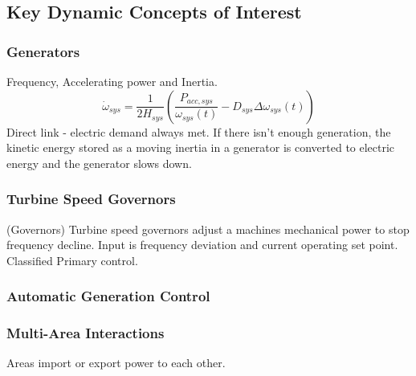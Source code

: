 \documentclass[14pt, unknownkeysallowed]{beamer}
\begin{document}
\subsection{Key Dynamic Concepts of Interest}
\begin{frame}
\frametitle{Generators}
Frequency, Accelerating power and Inertia.\\
\[ \dot{\omega}_{sys} = \dfrac{1}{2H_{sys} } \left( \dfrac{P_{acc, sys} }{\omega_{sys}(t)} - D_{sys}\Delta\omega_{sys}(t)  \right)\]
Direct link - electric demand always met. If there isn't enough generation, the kinetic energy stored as a moving inertia in a generator is converted to electric energy and the generator slows down.
\end{frame}
\begin{frame}
\frametitle{Turbine Speed Governors}
(Governors)
Turbine speed governors adjust a machines mechanical power to stop frequency decline. Input is frequency deviation and current operating set point. Classified Primary control.
\end{frame}
\begin{frame}
\frametitle{Automatic Generation Control}
\cite{kundur}
\end{frame}
\begin{frame}
\frametitle{Multi-Area Interactions}

Areas import or export power to each other.
\end{frame}
\end{document}
